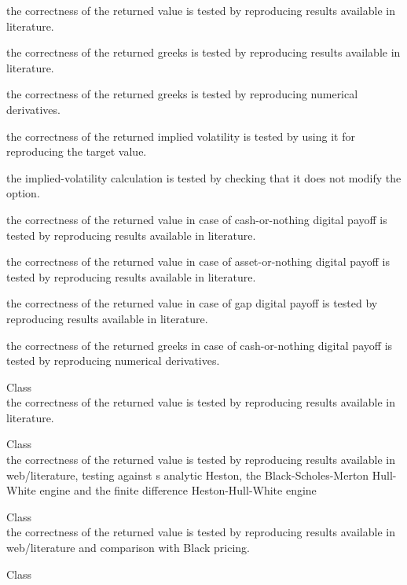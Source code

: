 \begin{DoxyRefList}
\begin{DoxyItemize}
\item the correctness of the returned value is tested by reproducing results available in literature.
\item the correctness of the returned greeks is tested by reproducing results available in literature.
\item the correctness of the returned greeks is tested by reproducing numerical derivatives.
\item the correctness of the returned implied volatility is tested by using it for reproducing the target value.
\item the implied-\/volatility calculation is tested by checking that it does not modify the option.
\item the correctness of the returned value in case of cash-\/or-\/nothing digital payoff is tested by reproducing results available in literature.
\item the correctness of the returned value in case of asset-\/or-\/nothing digital payoff is tested by reproducing results available in literature.
\item the correctness of the returned value in case of gap digital payoff is tested by reproducing results available in literature.
\item the correctness of the returned greeks in case of cash-\/or-\/nothing digital payoff is tested by reproducing numerical derivatives. 
\end{DoxyItemize}
\item[Class \doxylink{class_quant_lib_1_1_analytic_european_margrabe_engine}{Quant\+Lib\+::Analytic\+European\+Margrabe\+Engine} ]\hfill \\
\label{test__test000121}%
%
the correctness of the returned value is tested by reproducing results available in literature.  
\item[Class \doxylink{class_quant_lib_1_1_analytic_h1_h_w_engine}{Quant\+Lib\+::Analytic\+H1\+HWEngine} ]\hfill \\
\label{test__test000141}%
%
the correctness of the returned value is tested by reproducing results available in web/literature, testing against \textquotesingle{}s analytic Heston, the Black-\/\+Scholes-\/\+Merton Hull-\/\+White engine and the finite difference Heston-\/\+Hull-\/\+White engine  
\item[Class \doxylink{class_quant_lib_1_1_analytic_heston_engine}{Quant\+Lib\+::Analytic\+Heston\+Engine} ]\hfill \\
\label{test__test000142}%
%
the correctness of the returned value is tested by reproducing results available in web/literature and comparison with Black pricing.  
\item[Class \doxylink{class_quant_lib_1_1_analytic_heston_forward_european_engine}{Quant\+Lib\+::Analytic\+Heston\+Forward\+European\+Engine} ]\hfill \\
\label{test__test000010}%
%


\end{DoxyRefList}

